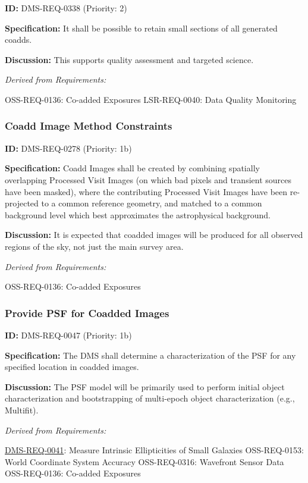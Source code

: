 \documentclass[SE,toc,lsstdraft]{lsstdoc}
\begin{document}
\label{DMS-REQ-0338}
\textbf{ID:} DMS-REQ-0338 (Priority: 2)

\textbf{Specification:} It shall be possible to retain small sections of all generated coadds.

\textbf{Discussion:} This supports quality assessment and targeted science.

\emph{Derived from Requirements:}

OSS-REQ-0136:
Co-added Exposures \newline
LSR-REQ-0040:
Data Quality Monitoring \newline

\subsubsection{Coadd Image Method Constraints}

\label{DMS-REQ-0278}
\textbf{ID:} DMS-REQ-0278 (Priority: 1b)

\textbf{Specification:} Coadd Images shall be created by combining spatially overlapping Processed Visit Images (on which bad pixels and transient sources have been masked), where the contributing Processed Visit Images have been re-projected to a common reference geometry, and matched to a common background level which best approximates the astrophysical background.

\textbf{Discussion:} It is expected that coadded images will be produced for all observed regions of the sky, not just the main survey area.

\emph{Derived from Requirements:}

OSS-REQ-0136:
Co-added Exposures \newline

\subsubsection{Provide PSF for Coadded Images}

\label{DMS-REQ-0047}
\textbf{ID:} DMS-REQ-0047 (Priority: 1b)

\textbf{Specification:} The DMS shall determine a characterization of the PSF for any specified location in coadded images.

\textbf{Discussion:} The PSF model will be primarily used to perform initial object characterization and bootstrapping of multi-epoch object characterization (e.g., Multifit).

\emph{Derived from Requirements:}

\hyperref[DMS-REQ-0041]{DMS-REQ-0041}:
Measure Intrinsic Ellipticities of Small Galaxies \newline
OSS-REQ-0153:
World Coordinate System Accuracy \newline
OSS-REQ-0316:
Wavefront Sensor Data \newline
OSS-REQ-0136:
Co-added Exposures \newline
\end{document}
